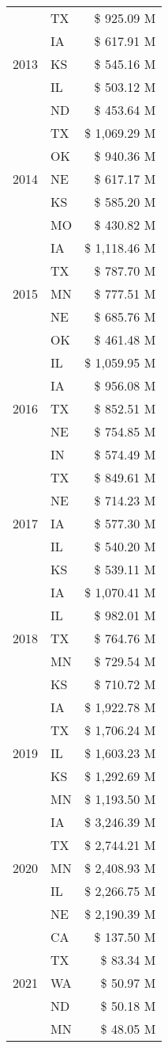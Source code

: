 \begin{longtable}{llr}
\cline{1-3}
\multirow[t]{5}{*}{2013} & TX & \$ 925.09 M \\
 & IA & \$ 617.91 M \\
 & KS & \$ 545.16 M \\
 & IL & \$ 503.12 M \\
 & ND & \$ 453.64 M \\
\cline{1-3}
\multirow[t]{5}{*}{2014} & TX & \$ 1,069.29 M \\
 & OK & \$ 940.36 M \\
 & NE & \$ 617.17 M \\
 & KS & \$ 585.20 M \\
 & MO & \$ 430.82 M \\
\cline{1-3}
\multirow[t]{5}{*}{2015} & IA & \$ 1,118.46 M \\
 & TX & \$ 787.70 M \\
 & MN & \$ 777.51 M \\
 & NE & \$ 685.76 M \\
 & OK & \$ 461.48 M \\
\cline{1-3}
\multirow[t]{5}{*}{2016} & IL & \$ 1,059.95 M \\
 & IA & \$ 956.08 M \\
 & TX & \$ 852.51 M \\
 & NE & \$ 754.85 M \\
 & IN & \$ 574.49 M \\
\cline{1-3}
\multirow[t]{5}{*}{2017} & TX & \$ 849.61 M \\
 & NE & \$ 714.23 M \\
 & IA & \$ 577.30 M \\
 & IL & \$ 540.20 M \\
 & KS & \$ 539.11 M \\
\cline{1-3}
\multirow[t]{5}{*}{2018} & IA & \$ 1,070.41 M \\
 & IL & \$ 982.01 M \\
 & TX & \$ 764.76 M \\
 & MN & \$ 729.54 M \\
 & KS & \$ 710.72 M \\
\cline{1-3}
\multirow[t]{5}{*}{2019} & IA & \$ 1,922.78 M \\
 & TX & \$ 1,706.24 M \\
 & IL & \$ 1,603.23 M \\
 & KS & \$ 1,292.69 M \\
 & MN & \$ 1,193.50 M \\
\cline{1-3}
\multirow[t]{5}{*}{2020} & IA & \$ 3,246.39 M \\
 & TX & \$ 2,744.21 M \\
 & MN & \$ 2,408.93 M \\
 & IL & \$ 2,266.75 M \\
 & NE & \$ 2,190.39 M \\
\cline{1-3}
\multirow[t]{5}{*}{2021} & CA & \$ 137.50 M \\
 & TX & \$ 83.34 M \\
 & WA & \$ 50.97 M \\
 & ND & \$ 50.18 M \\
 & MN & \$ 48.05 M \\
\cline{1-3}
\bottomrule
\end{longtable}
